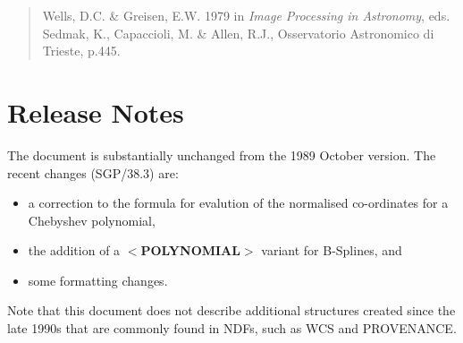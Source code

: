 \documentclass[twoside,11pt]{article}
\renewcommand{\_}{\texttt{\symbol{95}}}
\begin{document}
\begin{verse}
\hspace{-9.2mm}
Wells, D.C. \& Greisen, E.W.  1979 in {\it Image Processing in Astronomy},
eds. Sedmak, K., Capaccioli, M. \& Allen, R.J., Osservatorio Astronomico
di Trieste, p.445.
\vspace{-2mm}
\end{verse}

\appendix
\section{Release Notes}
The document is substantially unchanged from the 1989 October version.
The recent changes (SGP/38.3) are:
\begin{itemize}
\item a correction to the formula for evalution of the normalised
co-ordinates for a Chebyshev polynomial,
\item the addition of a $<${\bf POLYNOMIAL}$>$ variant for B-Splines,
and
\item some formatting changes.
\end{itemize}

Note that this document does not describe additional structures
created since the late 1990s that are commonly found in NDFs, such as
WCS and PROVENANCE.
\end{document}
